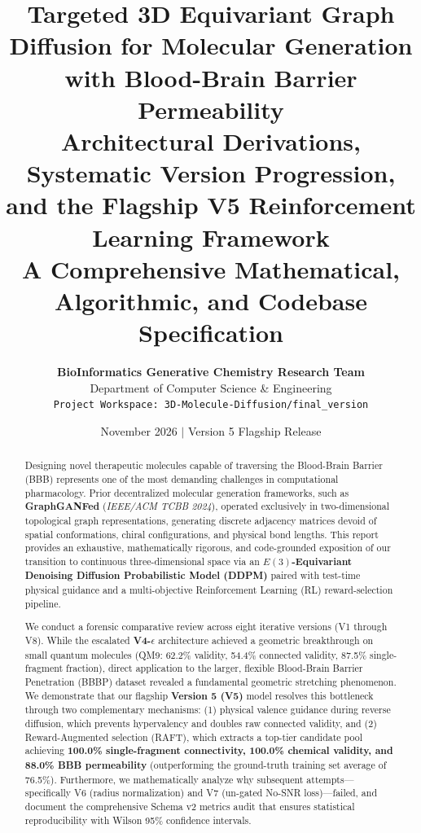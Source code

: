 \documentclass[11pt, a4paper]{article}
\title{
    \vspace{-1.0cm}
    \textbf{\Large Targeted 3D Equivariant Graph Diffusion for Molecular Generation with Blood-Brain Barrier Permeability}\\[0.5em]
    \large Architectural Derivations, Systematic Version Progression, and the Flagship V5 Reinforcement Learning Framework\\[0.3em]
    \normalsize A Comprehensive Mathematical, Algorithmic, and Codebase Specification
}
\author{
    \textbf{BioInformatics Generative Chemistry Research Team}\\
    Department of Computer Science \& Engineering\\
    \texttt{Project Workspace: 3D-Molecule-Diffusion/final\_version}
}
\date{November 2026 \quad $\vert$ \quad Version 5 Flagship Release}
\begin{document}
\maketitle
\thispagestyle{empty}

\begin{abstract}
\noindent
Designing novel therapeutic molecules capable of traversing the Blood-Brain Barrier (BBB) represents one of the most demanding challenges in computational pharmacology. Prior decentralized molecular generation frameworks, such as \textbf{GraphGANFed} (\textit{IEEE/ACM TCBB 2024}), operated exclusively in two-dimensional topological graph representations, generating discrete adjacency matrices devoid of spatial conformations, chiral configurations, and physical bond lengths. This report provides an exhaustive, mathematically rigorous, and code-grounded exposition of our transition to continuous three-dimensional space via an \textbf{$E(3)$-Equivariant Denoising Diffusion Probabilistic Model (DDPM)} paired with test-time physical guidance and a multi-objective Reinforcement Learning (RL) reward-selection pipeline.

We conduct a forensic comparative review across eight iterative versions (V1 through V8). While the escalated \textbf{V4-$\epsilon$} architecture achieved a geometric breakthrough on small quantum molecules (QM9: 62.2\% validity, 54.4\% connected validity, 87.5\% single-fragment fraction), direct application to the larger, flexible Blood-Brain Barrier Penetration (BBBP) dataset revealed a fundamental geometric stretching phenomenon. We demonstrate that our flagship \textbf{Version 5 (V5)} model resolves this bottleneck through two complementary mechanisms: (1) physical valence guidance during reverse diffusion, which prevents hypervalency and doubles raw connected validity, and (2) Reward-Augmented selection (RAFT), which extracts a top-tier candidate pool achieving \textbf{100.0\% single-fragment connectivity, 100.0\% chemical validity, and 88.0\% BBB permeability} (outperforming the ground-truth training set average of 76.5\%). Furthermore, we mathematically analyze why subsequent attempts---specifically V6 (radius normalization) and V7 (un-gated No-SNR loss)---failed, and document the comprehensive Schema v2 metrics audit that ensures statistical reproducibility with Wilson 95\% confidence intervals.
\end{abstract}

\vspace{1em}
\tableofcontents
\newpage
\end{document}
